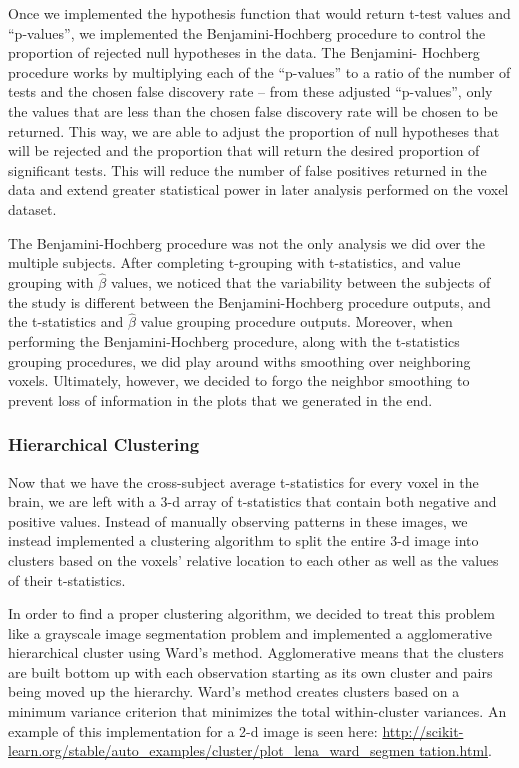 \par Once we implemented the hypothesis function that would return t-test 
values and ``p-values'', we implemented the Benjamini-Hochberg procedure to 
control the proportion of rejected null hypotheses in the data. The Benjamini-
Hochberg procedure works by multiplying each of the ``p-values'' to a ratio of 
the number of tests and the chosen false discovery rate -- from these adjusted 
``p-values'', only the values that are less than the chosen false discovery 
rate will be chosen to be returned. This way, we are able to adjust the 
proportion of null hypotheses that will be rejected and the proportion that 
will return the desired proportion of significant tests. This will reduce the
number of false positives returned in the data and extend greater statistical 
power in later analysis performed on the voxel dataset.

\par The Benjamini-Hochberg procedure was not the only analysis we did over the
multiple subjects. After completing t-grouping with t-statistics, and value 
grouping with $\hat{\beta}$ values, we noticed that the variability between the
subjects of the study is different between the Benjamini-Hochberg procedure 
outputs, and the t-statistics and $\hat{\beta}$ value grouping procedure 
outputs. Moreover, when performing the Benjamini-Hochberg procedure, along with
the t-statistics grouping procedures, we did play around withs smoothing over 
neighboring voxels. Ultimately, however, we decided to forgo the neighbor 
smoothing to prevent loss of information in the plots that we generated in the 
end.

\subsubsection{Hierarchical Clustering}

\par Now that we have the cross-subject average t-statistics for every voxel 
in the brain, we are left with a 3-d array of t-statistics that contain both 
negative and positive values. Instead of manually observing patterns in these 
images, we instead implemented a clustering algorithm to split the entire 3-d 
image into clusters based on the voxels' relative location to each other as 
well as the values of their t-statistics.

\par In order to find a proper clustering algorithm, we decided to treat this
problem like a grayscale image segmentation problem and implemented a
agglomerative hierarchical cluster using Ward's method. Agglomerative means
that the clusters are built bottom up with each observation starting as its
own cluster and pairs being moved up the hierarchy. Ward's method creates
clusters based on a minimum variance criterion that minimizes the total
within-cluster variances. An example of this implementation for a 2-d image is
seen here: 
\url{http://scikit-learn.org/stable/auto_examples/cluster/plot_lena_ward_segmen
tation.html}.

